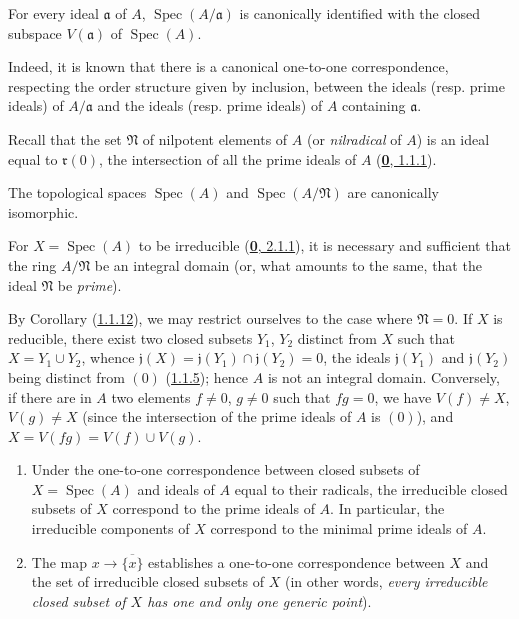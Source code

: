 \begin{proposition}[1.1.11]
\label{I.1.1.11}
For every ideal $\mathfrak{a}$ of $A$,
$\operatorname{Spec}(A/\mathfrak{a})$ is canonically identified with the
closed subspace $V(\mathfrak{a})$ of $\operatorname{Spec}(A)$.
\end{proposition}

Indeed, it is known that there is a canonical one-to-one correspondence,
respecting the order structure given by inclusion, between the ideals (resp.
prime ideals) of $A/\mathfrak{a}$ and the ideals (resp. prime ideals) of $A$
containing $\mathfrak{a}$.

Recall that the set $\mathfrak{N}$ of nilpotent elements of $A$ (or
\emph{nilradical} of $A$) is an ideal equal to $\mathfrak{r}(0)$, the
intersection of all the prime ideals of $A$
(\hyperref[0.1.1.1]{\textbf{0}, 1.1.1}).

\begin{corollary}[1.1.12]
\label{I.1.1.12}
The topological spaces $\operatorname{Spec}(A)$ and
$\operatorname{Spec}(A/\mathfrak{N})$ are canonically isomorphic.
\end{corollary}

\begin{proposition}[1.1.13]
\label{I.1.1.13}
For $X=\operatorname{Spec}(A)$ to be irreducible
\textup{(\hyperref[0.2.1.1]{\textbf{0}, 2.1.1})}, it is necessary and sufficient that the
ring $A/\mathfrak{N}$ be an integral domain \textup{(or, what amounts to the same,
that the ideal $\mathfrak{N}$ be \emph{prime})}.
\end{proposition}

By Corollary (\hyperref[I.1.1.12]{1.1.12}), we may restrict ourselves to
the case where $\mathfrak{N}=0$. If $X$ is reducible, there exist two closed
subsets $Y_1$, $Y_2$ distinct from $X$ such that $X=Y_1\cup Y_2$, whence
$\mathfrak{j}(X)=\mathfrak{j}(Y_1)\cap\mathfrak{j}(Y_2)=0$, the ideals
$\mathfrak{j}(Y_1)$ and $\mathfrak{j}(Y_2)$ being distinct from $(0)$
(\hyperref[I.1.1.5]{1.1.5}); hence $A$ is not an integral domain.
Conversely, if there are in $A$ two elements $f\neq0$, $g\neq0$ such that
$fg=0$, we have $V(f)\neq X$, $V(g)\neq X$ (since the intersection of the
prime ideals of $A$ is $(0)$), and $X=V(fg)=V(f)\cup V(g)$.

\begin{corollary}[1.1.14]
\label{I.1.1.14}
\begin{enumerate}
  \item[\rm(i)] Under the one-to-one correspondence between closed subsets
  of $X=\operatorname{Spec}(A)$ and ideals of $A$ equal to their radicals,
  the irreducible closed subsets of $X$ correspond to the prime ideals of
  $A$. In particular, the irreducible components of $X$ correspond to the
  minimal prime ideals of $A$.
  \item[\rm(ii)] The map $x\to\overline{\{x\}}$ establishes a
  one-to-one correspondence between $X$ and the set of irreducible closed
  subsets of $X$ \textup{(in other words, \emph{every irreducible closed subset of $X$
  has one and only one generic point})}.
\end{enumerate}
\end{corollary}

